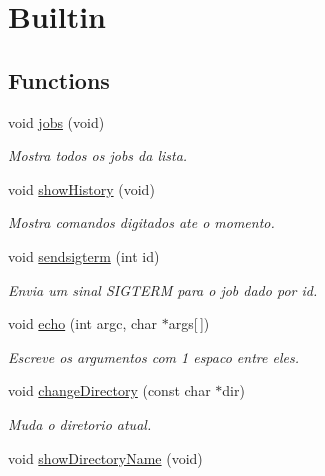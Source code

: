 \hypertarget{group__Builtin}{
\section{Builtin}
\label{group__Builtin}
}
\subsection*{Functions}
\begin{DoxyCompactItemize}
\item 
\hypertarget{group__Builtin_ga1dbeb31edd7af44ae1b85171480b01fa}{
void \hyperlink{group__Builtin_ga1dbeb31edd7af44ae1b85171480b01fa}{jobs} (void)}
\label{group__Builtin_ga1dbeb31edd7af44ae1b85171480b01fa}

\begin{DoxyCompactList}\small\item\em Mostra todos os jobs da lista. \end{DoxyCompactList}\item 
\hypertarget{group__Builtin_ga478ac1b18e4d00275c6099bf6e3b9fc6}{
void \hyperlink{group__Builtin_ga478ac1b18e4d00275c6099bf6e3b9fc6}{showHistory} (void)}
\label{group__Builtin_ga478ac1b18e4d00275c6099bf6e3b9fc6}

\begin{DoxyCompactList}\small\item\em Mostra comandos digitados ate o momento. \end{DoxyCompactList}\item 
void \hyperlink{group__Builtin_ga460421fbb6a8b9f00cece4ed94ea1ce1}{sendsigterm} (int id)
\begin{DoxyCompactList}\small\item\em Envia um sinal SIGTERM para o job dado por id. \end{DoxyCompactList}\item 
void \hyperlink{group__Builtin_gad8fec49ba2349ed854c1172d14676697}{echo} (int argc, char $\ast$args\mbox{[}$\,$\mbox{]})
\begin{DoxyCompactList}\small\item\em Escreve os argumentos com 1 espaco entre eles. \end{DoxyCompactList}\item 
void \hyperlink{group__Builtin_ga4fc7bbc95c3bcdc5faa5012ddf404913}{changeDirectory} (const char $\ast$dir)
\begin{DoxyCompactList}\small\item\em Muda o diretorio atual. \end{DoxyCompactList}\item 
\hypertarget{group__Builtin_ga6f6fd30fb241544435ae349effcf453c}{
void \hyperlink{group__Builtin_ga6f6fd30fb241544435ae349effcf453c}{showDirectoryName} (void)}
\label{group__Builtin_ga6f6fd30fb241544435ae349effcf453c}


\end{DoxyCompactItemize}
